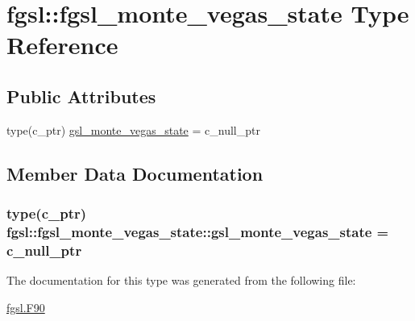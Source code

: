 \hypertarget{structfgsl_1_1fgsl__monte__vegas__state}{}\section{fgsl\+:\+:fgsl\+\_\+monte\+\_\+vegas\+\_\+state Type Reference}
\label{structfgsl_1_1fgsl__monte__vegas__state}
\subsection*{Public Attributes}
\begin{DoxyCompactItemize}
\item 
type(c\+\_\+ptr) \hyperlink{structfgsl_1_1fgsl__monte__vegas__state_a83aa57695c0fdada3a33a46261f0e00f}{gsl\+\_\+monte\+\_\+vegas\+\_\+state} = c\+\_\+null\+\_\+ptr
\end{DoxyCompactItemize}


\subsection{Member Data Documentation}
\hypertarget{structfgsl_1_1fgsl__monte__vegas__state_a83aa57695c0fdada3a33a46261f0e00f}{}
\subsubsection[{gsl\+\_\+monte\+\_\+vegas\+\_\+state}]{\setlength{\rightskip}{0pt plus 5cm}type(c\+\_\+ptr) fgsl\+::fgsl\+\_\+monte\+\_\+vegas\+\_\+state\+::gsl\+\_\+monte\+\_\+vegas\+\_\+state = c\+\_\+null\+\_\+ptr}\label{structfgsl_1_1fgsl__monte__vegas__state_a83aa57695c0fdada3a33a46261f0e00f}


The documentation for this type was generated from the following file\+:\begin{DoxyCompactItemize}
\item 
\hyperlink{fgsl_8F90}{fgsl.\+F90}\end{DoxyCompactItemize}
